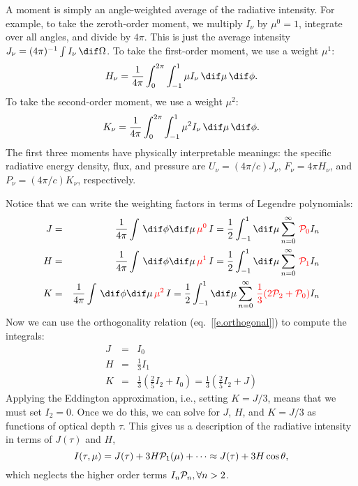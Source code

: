 \begin{sidebar}
 A moment is simply an angle-weighted average of the radiative intensity. For example, to take the zeroth-order moment, we multiply $I_{\nu}$ by $\mu^{0}=1$, integrate over all angles, and divide by $4\pi$. This is just the average intensity $J_{\nu} = (4\pi)^{-1}\int I_{\nu}\,\dif\Omega$. To take the first-order moment, we use a weight $\mu^{1}$:
\[
	H_{\nu} = \frac{1}{4\pi}\int_{0}^{2\pi}\int_{-1}^{1}\mu I_{\nu}\,\dif\mu\,\dif\phi.
\]
To take the second-order moment, we use a weight $\mu^{2}$:
\[
	K_{\nu} = \frac{1}{4\pi}\int_{0}^{2\pi}\int_{-1}^{1}\mu^{2} I_{\nu}\,\dif\mu\,\dif\phi.
\]
The first three moments have physically interpretable meanings: the specific radiative energy density, flux, and pressure are $U_{\nu} = (4\pi/c)J_{\nu}$, $F_{\nu} = 4\pi H_{\nu}$, and $P_{\nu} = (4\pi/c) K_{\nu}$, respectively.



Notice that we can write the weighting factors in terms of Legendre polynomials:
\begin{eqnarray*}
	J &=& \frac{1}{4\pi}\int\,\dif\phi\dif\mu\,{\color{red}\mu^{0}}\,I 
		= \frac{1}{2}\int_{-1}^{1}\dif\mu\sum_{n=0}^{\infty} \,{\color{red}\Pl{0}} I_{n} \\
	H &=& \frac{1}{4\pi}\int\,\dif\phi\dif\mu\,{\color{red}\mu^{1}}\,I 
		= \frac{1}{2}\int_{-1}^{1}\dif\mu\sum_{n=0}^{\infty} \,{\color{red}\Pl{1}} I_{n} \\
	K &=& \frac{1}{4\pi}\int\,\dif\phi\dif\mu\,{\color{red}\mu^{2}}\,I 
		= \frac{1}{2}\int_{-1}^{1}\dif\mu\sum_{n=0}^{\infty} \,{\color{red} \frac{1}{3}(2\Pl{2}+\Pl{0})} I_{n}
\end{eqnarray*}
Now we can use the orthogonality relation (eq.~[\ref{e.orthogonal}]) to compute the integrals:
\begin{eqnarray*}
	J &=& I_{0} \\
	H &=& \frac{1}{3}I_{1} \\
	K &=& \frac{1}{3}\left(\frac{2}{5}I_{2} + I_{0}\right)
		= \frac{1}{3}\left(\frac{2}{5}I_{2} + J\right)
\end{eqnarray*}
Applying the Eddington approximation, i.e., setting $K = J/3$, means that we must set $I_{2} = 0$. Once we do this, we can solve for $J$, $H$, and $K=J/3$ as functions of optical depth $\tau$. This gives us a description of the radiative intensity in terms of $J(\tau)$ and $H$,
\[
	I(\tau,\mu) = J(\tau) + 3H \mathcal{P}_{1}(\mu) + \cdots \approx J(\tau) + 3H\cos\theta,
\]
which neglects the higher order terms $I_{n}\mathcal{P}_{n},\forall n > 2$.
\end{sidebar}


